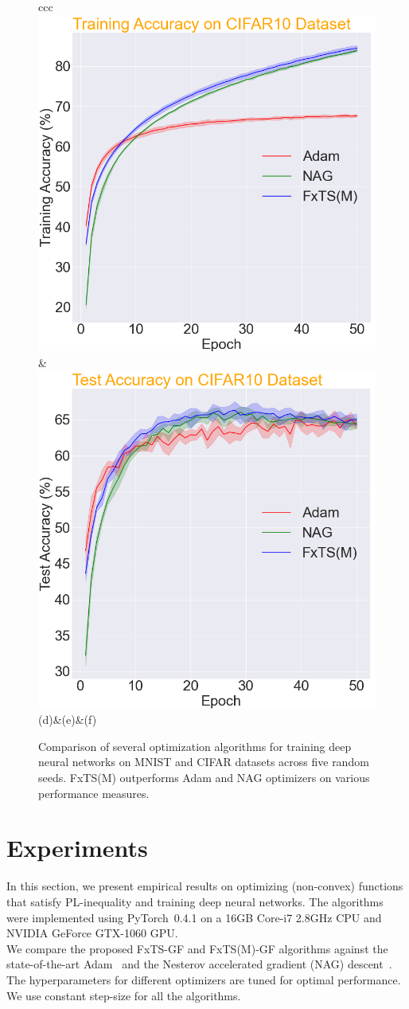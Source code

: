 \documentclass[letterpaper]{article}
\begin{document}
\begin{figure}[!ht]
\begin{center}
\begin{tabular}{ccc}
			\includegraphics[width=0.5\columnwidth]{Figures/TrainAcc_CIFAR10.png}&
			\includegraphics[width=0.5\columnwidth]{Figures/TestAcc_CIFAR10.png}\cr
			(d)&(e)&(f)
		\end{tabular}
		\caption{Comparison of several optimization algorithms for training deep neural networks on MNIST and CIFAR datasets across five random seeds. FxTS(M) outperforms Adam and NAG optimizers on various performance measures.}
		\label{fig:NN}
	\end{center}
	\vspace{-1.5em}
\end{figure}

\vspace{-.5em}\section{Experiments} \label{sec: experiments}
In this section, we present empirical results on optimizing (non-convex) functions that satisfy PL-inequality and training deep neural networks. The algorithms were implemented using PyTorch~0.4.1 on a 16GB Core-i7 2.8GHz CPU and NVIDIA GeForce GTX-1060 GPU.\\
 We compare the proposed FxTS-GF and FxTS(M)-GF algorithms against the state-of-the-art Adam~\cite{kingma2015adam} and the Nesterov accelerated gradient (NAG) descent~\cite{polyak1964some, sutskever2013importance}. The hyperparameters for different optimizers are tuned for optimal performance. We use constant step-size for all the algorithms.
\end{document}
